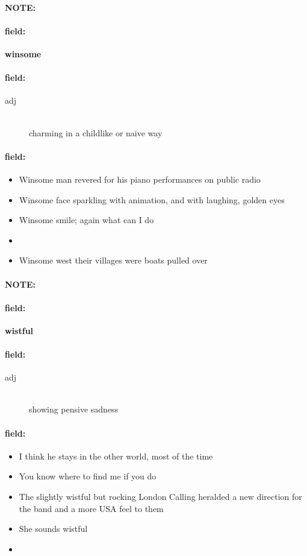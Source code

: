 \documentclass[12pt]{article}
\newenvironment{note}{\paragraph{NOTE:}}{}
\newenvironment{field}{\paragraph{field:}}{}
\begin{document}
\begin{note}
\begin{field}
\textbf{\large winsome}
\end{field}


\begin{field}
\begin{description}
\item[adj] \hfill \\ 
charming in a childlike or naive way

\end{description}
\end{field}

\begin{field}
\begin{itemize}
\item Winsome man revered for his piano performances on public radio
\item Winsome face sparkling with animation, and with laughing, golden eyes
\item Winsome smile; again what can I do
\item 
\item Winsome west their villages were boats pulled over
\end{itemize}
\end{field}
\end{note}
\begin{note}
\begin{field}
\textbf{\large wistful}
\end{field}


\begin{field}
\begin{description}
\item[adj] \hfill \\ 
showing pensive sadness

\end{description}
\end{field}

\begin{field}
\begin{itemize}
\item I think he stays in the other world, most of the time
\item You know where to find me if you do
\item The slightly wistful but rocking London Calling heralded a new direction for the band and a more USA feel to them
\item  She sounds wistful
\item 
\end{itemize}
\end{field}
\end{note}
\end{document}
